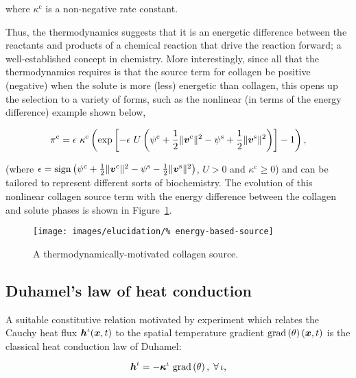\noindent where $\kappa^{\mathrm{c}}$ is a non-negative rate
constant.

Thus, the thermodynamics suggests that it is an energetic difference
between the reactants and products of a chemical reaction that drive
the reaction forward; a well-established concept in
chemistry. More interestingly, since all that the thermodynamics
requires is that the source term for collagen be positive (negative)
when the solute is more (less) energetic than collagen, this opens up
the selection to a variety of forms, such as the nonlinear (in terms
of the energy difference) example shown below,

\begin{equation}
\pi^{\mathrm{c}}=\epsilon\ \kappa^{\mathrm{c}}\left( \mathrm{exp}
\left[-\epsilon\ U \left(\psi^{\mathrm{c}}+\frac{1}{2} \Vert\bv^{\mathrm{c}}\Vert^2 - 
 \psi^{\mathrm{s}}+\frac{1}{2} \Vert\bv^{\mathrm{s}}\Vert^2\right) \right]
 - 1\right),
\label{eu-energy-source-nonlinear}
\end{equation}

\noindent (where $\epsilon =
\mathrm{sign}\left(\psi^{\mathrm{c}}+\frac{1}{2}
\Vert\mbox{\boldmath$ v$}^{\mathrm{c}}\Vert^2 - \psi^{\mathrm{s}}-\frac{1}{2}
\Vert\mbox{\boldmath$ v$}^{\mathrm{s}}\Vert^2\right)$, $U>0$ and
$\kappa^{\mathrm{c}}\geq 0$) and can be tailored to represent
different sorts of biochemistry. The evolution of this nonlinear
collagen source term with the energy difference between the collagen
and solute phases is shown in Figure~\ref{energy-based-source}.

\begin{figure}
  \centering
  \texttt{[image: images/elucidation/\%
    energy-based-source]}
  \caption{A thermodynamically-motivated collagen source.}
  \label{energy-based-source}
\end{figure}

\subsection{Duhamel's law of heat conduction}
\label{eu-duhamel-law}

A suitable constitutive relation motivated by experiment which relates
the Cauchy heat flux $\mbox{\boldmath$ h$}^{\iota}(\mbox{\boldmath$ x$},t)$ to the spatial temperature
gradient $\mathrm{grad}\left(\theta\right)(\mbox{\boldmath$ x$},t)$ is the classical
heat conduction law of Duhamel:

\begin{equation}
\bh^{\iota} =  - \Bkappa^{\iota}\ \mathrm{grad}\left(\theta\right),\;\forall\,\iota,
\end{equation}

